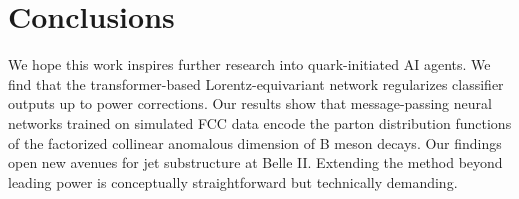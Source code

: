 \section{Conclusions}\label{sec:conclusions}

We hope this work inspires further research into quark-initiated AI
agents. We find that the transformer-based Lorentz-equivariant network
regularizes classifier outputs up to power corrections. Our results show
that message-passing neural networks trained on simulated FCC data
encode the parton distribution functions of the factorized collinear
anomalous dimension of B meson decays. Our findings open new avenues for
jet substructure at Belle II. Extending the method beyond leading power
is conceptually straightforward but technically demanding.

